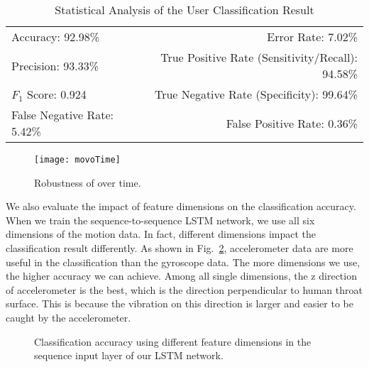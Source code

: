 \begin{table}[t]
	\caption{Statistical Analysis of the User Classification Result}
	\label{tab:userTable}
	\centering
	\begin{tabular}{lr}
		\toprule
		Accuracy: 92.98\% & \hspace{-.55in} Error Rate: 7.02\% \\
		Precision: 93.33\% & \hspace{-.55in} True Positive Rate (Sensitivity/Recall): 94.58\% \\
		$F_1$ Score: 0.924 & \hspace{-.55in} True Negative Rate (Specificity): 99.64\% \\
		False Negative Rate: 5.42\%  & \hspace{-.55in} False Positive Rate: 0.36\% \\
		\bottomrule
	\end{tabular}
\end{table}
\begin{figure}[h]
	\centering
	\texttt{[image: movoTime]}
	\caption{Robustness of {\shortname} over time.}
	\label{fig:time}
\end{figure}



We also evaluate the impact of feature dimensions on the classification accuracy. When we train the sequence-to-sequence LSTM network, we use all six dimensions of the motion data. In fact, different dimensions impact the classification result differently. As shown in Fig.~\ref{fig:axis}, accelerometer data are more useful in the classification than the gyroscope data. The more dimensions we use, the higher accuracy we can achieve. Among all single dimensions, the z direction of accelerometer is the best, which is the direction perpendicular to human throat surface. This is because the vibration on this direction is larger and easier to be caught by the accelerometer.

\begin{figure}[h]
	\centering
	\caption{Classification accuracy using different feature dimensions in the sequence input layer of our LSTM network.}
	\label{fig:axis}
\end{figure}








